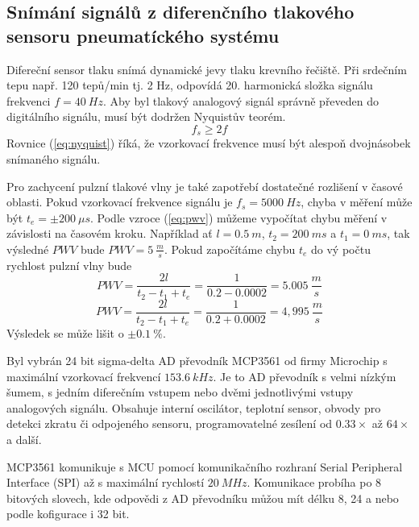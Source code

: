\subsection{Snímání signálů z diferenčního tlakového sensoru pneumatíckého systému} \label{section:mcp3561_hw}
Difereční sensor tlaku snímá dynamické jevy tlaku krevního řečiště. Při srdečním tepu např. 120 tepů/min tj. 2 Hz, odpovídá 20. harmonická složka signálu frekvenci  $f = 40 \ Hz$. Aby byl tlakový analogový signál správně převeden do digitálního signálu, musí být dodržen Nyquistův teorém.
\begin{equation} \label{eq:nyquist}
    f_s \geq 2f
\end{equation}
Rovnice (\ref{eq:nyquist}) říká, že vzorkovací frekvence musí být alespoň dvojnásobek snímaného signálu.
\par
Pro zachycení pulzní tlakové vlny je také zapotřebí dostatečné rozlišení v časové oblasti. Pokud vzorkovací frekvence signálu je $f_s = 5000 \ Hz$, chyba v měření může být $t_e = \pm 200 \ \mu s$. Podle vzroce (\ref{eq:pwv}) můžeme vypočítat chybu měření v závislosti na časovém kroku.
Například ať $l = 0.5 \ m$, $t_2 = 200 \ ms$ a $t_1 = 0 \ ms$, tak výsledné $PWV$ bude $PWV = 5 \ \frac{m}{s}$. Pokud započítáme chybu $t_e$ do vý počtu rychlost pulzní vlny bude
\begin{equation*}
    PWV = \frac{2l}{t_2 - t_1 + t_e} = \frac{1}{0.2 - 0.0002} = 5.005 \ \frac{m}{s}
\end{equation*}
\begin{equation*}
    PWV = \frac{2l}{t_2 - t_1 + t_e} = \frac{1}{0.2 + 0.0002} = 4,995 \ \frac{m}{s}
\end{equation*}
Výsledek se může lišit o $\pm 0.1 \ \%$.
\par
Byl vybrán 24 bit sigma-delta AD převodník MCP3561 od firmy Microchip s maximální vzorkovací frekvencí $153.6 \ kHz$. Je to AD převodník s velmi nízkým šumem, s jedním diferečním vstupem nebo dvěmi jednotlivými vstupy analogových signálu.
Obsahuje interní oscilátor, teplotní sensor, obvody pro detekci zkratu či odpojeného sensoru, programovatelné zesílení od $0.33 \times$ až $64 \times$ a další.
\par
MCP3561 komunikuje s MCU pomocí komunikačního rozhraní Serial Peripheral Interface (SPI) až s maximální rychlostí $20 \ MHz$. Komunikace probíha po 8 bitových slovech, kde odpovědi z AD převodníku můžou mít délku 8, 24 a nebo podle kofigurace i 32 bit.
